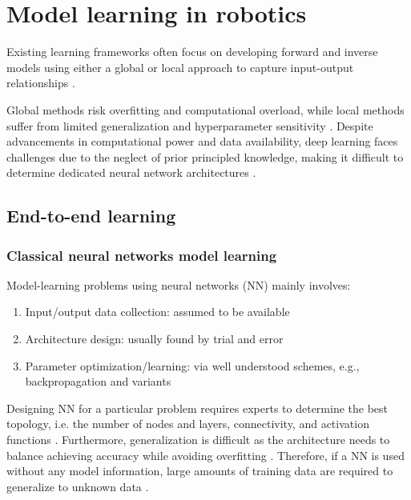 \section{Model learning in robotics}
Existing learning frameworks often focus on developing forward and inverse models using either a global or local approach to capture input-output relationships \cite{NguyenTuong2011Modellearningrobot}.

Global methods risk overfitting and computational overload, while local methods suffer from limited generalization and hyperparameter sensitivity \cite{Thrun2002Probabilisticrobotics,Goodfellow2016DeepLearning}. Despite advancements in computational power and data availability, deep learning faces challenges due to the neglect of prior principled knowledge, making it difficult to determine dedicated neural network architectures \cite{Baker2017Designingneuralnetwork,Elsken2019Neuralarchitecturesearch}. 

\subsection{End-to-end learning}

\subsubsection{Classical neural networks model learning}
Model-learning problems using neural networks (NN) mainly involves:
\begin{enumerate}
	\item Input/output data collection: assumed to be available
	\item Architecture design: usually found by trial and error
	\item Parameter optimization/learning: via well understood schemes, e.g., backpropagation and variants
\end{enumerate}
Designing NN for a particular problem requires experts to determine the best topology, i.e. the number of nodes and layers, connectivity, and activation functions \cite{Matteucci2006ELeaRNTEvolutionarylearning}. Furthermore, generalization is difficult as the architecture needs to balance achieving accuracy while avoiding overfitting \cite{Rocha2005Simultaneousevolutionneural,He2015Topologicaloptimisationartificial,Matteucci2006ELeaRNTEvolutionarylearning,Kwok1995Constructivefeedforwardneural,Lawrence1998Whatsizeneural,Talebi2010NeuralNetworkBased}. Therefore, if a NN is used without any model information, large amounts of training data are required to generalize to unknown data \cite{Urolagin2012Generalizationcapabilityartificial}.

